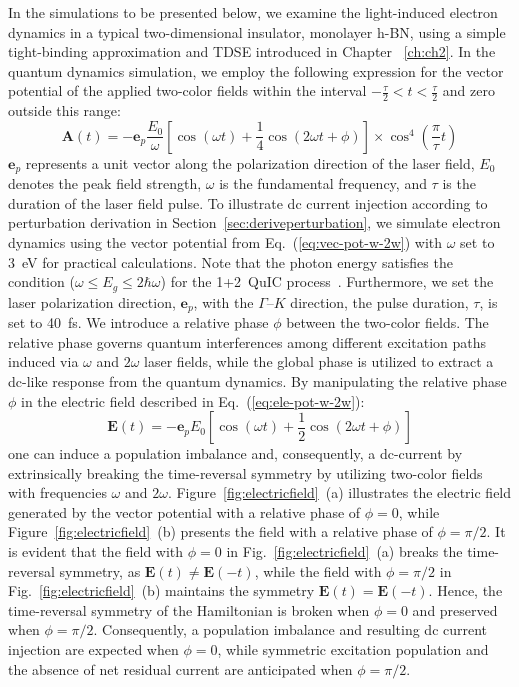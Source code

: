  In the simulations to be presented below, we examine the light-induced electron dynamics in a typical two-dimensional insulator, monolayer \gls{h-BN}, using a simple tight-binding approximation and \gls{TDSE} introduced in Chapter ~\ref{ch:ch2}. In the quantum dynamics simulation, we employ the following expression for the vector potential of the applied two-color fields within the interval $-\frac{\tau}{2} < t < \frac{\tau}{2}$ and zero outside this range:
\begin{equation}
\mathbf{A}(t) = -\mathbf{e}_p \frac{E_0}{\omega} \left [
\cos \left (\omega t \right ) + \frac{1}{4}\cos
\left (2\omega t + \phi \right )
\right ] \times \cos^4 \left (\frac{\pi}{\tau}t \right )
\end{equation}
$\mathbf{e}_p$ represents a unit vector along the polarization direction of the laser field, $E_0$ denotes the peak field strength, $\omega$ is the fundamental frequency, and $\tau$ is the duration of the laser field pulse. 
To illustrate dc current injection according to perturbation derivation in Section~\ref{sec:deriveperturbation}, we simulate electron dynamics using the vector potential from Eq.~(\ref{eq:vec-pot-w-2w}) with $\omega$ set to 3~eV for practical calculations. Note that the photon energy satisfies the condition ($\omega \le E_g \le 2\hbar \omega$) for the 1+2~\gls{QuIC} process~\cite{PhysRevLett.76.1703}. Furthermore,  we set the laser polarization direction, $\mathbf e_{p}$, with the $\Gamma$--$K$ direction, the pulse duration, $\tau$, is set to 40~fs.
We introduce a relative phase $\phi$ between the two-color fields. The relative phase governs quantum interferences among different excitation paths induced via $\omega$ and $2\omega$ laser fields, while the global phase is utilized to extract a dc-like response from the quantum dynamics.
By manipulating the relative phase $\phi$ in the electric field described in Eq.~(\ref{eq:ele-pot-w-2w}):
\begin{equation}
\mathbf{E}(t) =-\mathbf{e}_p {E_0} \left [
\cos \left (\omega t \right ) + \frac{1}{2}\cos
\left (2\omega t + \phi \right )
\right ] \nonumber
\label{eq:ele-pot-w-2w}
\end{equation}
one can induce a population imbalance and, consequently, a dc-current by extrinsically breaking the time-reversal symmetry by utilizing two-color fields with frequencies $\omega$ and $2\omega$. Figure~\ref{fig:electricfield}~(a) illustrates the electric field generated by the vector potential with a relative phase of $\phi=0$, while Figure~\ref{fig:electricfield}~(b) presents the field with a relative phase of $\phi=\pi/2$. It is evident that the field with $\phi=0$ in Fig.~\ref{fig:electricfield}~(a) breaks the time-reversal symmetry, as $\mathbf{E}(t) \neq \mathbf{E}(-t)$, while the field with $\phi=\pi/2$ in Fig.~\ref{fig:electricfield}~(b) maintains the symmetry $\mathbf{E}(t)=\mathbf{E}(-t)$. Hence, the time-reversal symmetry of the Hamiltonian is broken when $\phi=0$ and preserved when $\phi=\pi/2$. Consequently, a population imbalance and resulting dc current injection are expected when $\phi=0$, while symmetric excitation population and the absence of net residual current are anticipated when $\phi=\pi/2$.
